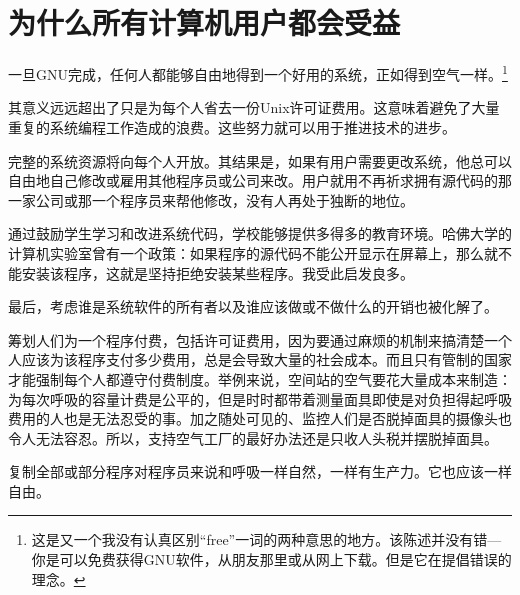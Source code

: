 \section{为什么所有计算机用户都会受益}
一旦GNU完成，任何人都能够自由地得到一个好用的系统，正如得到空气一样。\footnote{这是又一个我没有认真区别“free”一词的两种意思的地方。该陈述并没有错—你是可以免费获得GNU软件，从朋友那里或从网上下载。但是它在提倡错误的理念。}\par
其意义远远超出了只是为每个人省去一份Unix许可证费用。这意味着避免了大量重复的系统编程工作造成的浪费。这些努力就可以用于推进技术的进步。\par
完整的系统资源将向每个人开放。其结果是，如果有用户需要更改系统，他总可以自由地自己修改或雇用其他程序员或公司来改。用户就用不再祈求拥有源代码的那一家公司或那一个程序员来帮他修改，没有人再处于独断的地位。\par
通过鼓励学生学习和改进系统代码，学校能够提供多得多的教育环境。哈佛大学的计算机实验室曾有一个政策：如果程序的源代码不能公开显示在屏幕上，那么就不能安装该程序，这就是坚持拒绝安装某些程序。我受此启发良多。\par
最后，考虑谁是系统软件的所有者以及谁应该做或不做什么的开销也被化解了。\par
筹划人们为一个程序付费，包括许可证费用，因为要通过麻烦的机制来搞清楚一个人应该为该程序支付多少费用，总是会导致大量的社会成本。而且只有管制的国家才能强制每个人都遵守付费制度。举例来说，空间站的空气要花大量成本来制造：为每次呼吸的容量计费是公平的，但是时时都带着测量面具即使是对负担得起呼吸费用的人也是无法忍受的事。加之随处可见的、监控人们是否脱掉面具的摄像头也令人无法容忍。所以，支持空气工厂的最好办法还是只收人头税并摆脱掉面具。\par
复制全部或部分程序对程序员来说和呼吸一样自然，一样有生产力。它也应该一样自由。\par
